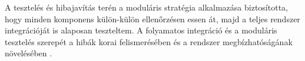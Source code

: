 A tesztelés és hibajavítás terén a moduláris stratégia alkalmazása biztosította, 
hogy minden komponens külön-külön ellenőrzésen essen át, majd a teljes rendszer integrációját is alaposan teszteltem. 
A folyamatos integráció és a moduláris tesztelés szerepét 
a hibák korai felismerésében és a rendszer megbízhatóságának növelésében \cite{Szalay2018,Kaposi2019}. 
\begin{comment}
\section{Tanulságok a kockázatkezelésből}

A projekt során szerzett tapasztalatok egyértelműen alátámasztották, hogy a kockázatok előrejelzése 
és kezelése alapvető fontosságú az önálló fejlesztések sikeréhez.  
Az előzetesen kialakított kockázatmátrix biztosította a legkritikusabb problémák azonosítását, 
így a figyelmet a rendszer stabilitását leginkább veszélyeztető területekre tudtam összpontosítani, 
miközben a kisebb kockázatok kezelését későbbre halaszthattam.  

A rendszeres tesztelés és részletes dokumentáció elősegítette a hibák gyors felismerését és 
javítását, növelte a fejlesztés átláthatóságát, valamint támogatta a későbbi bővítések gördülékeny megvalósítását.  
A moduláris tesztelési stratégia és az iteratív javítások kombinációja biztosította, hogy a 
rendszer megbízhatóan működjön, miközben a fejlesztési folyamat hatékonyan szervezett maradt.

Az időmenedzsment és a feladatpriorizálás kulcsfontosságú tényezőnek bizonyult a projekt folyamatos előrehaladásában.  
A napi és heti ütemtervek, valamint a rangsorolt feladatlista lehetővé tették, hogy a projekt 
haladása ne veszélyeztesse a munkavégzés minőségét és a határidők betartását.  
A strukturált időbeosztás és a fókuszált munkavégzés döntő jelentőségű a sikeres, önálló fejlesztéshez.
\end{comment}




